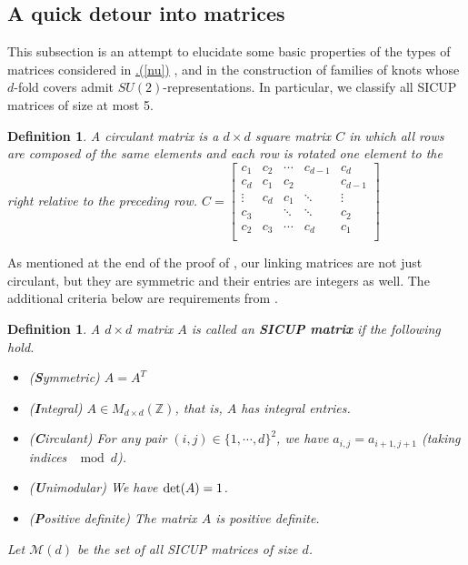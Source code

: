 \documentclass[11pt]{amsart}
\newtheorem{definition}[theorem]{Definition}
\newcommand{\Crefparts}[2]{%
  \hyperref[#2]{\Cref*{#1}.(\ref*{#2})}%
}
\newcommand{\Z}{\mathbb{Z}}
\newcommand{\bdefn}{\begin{definition}}
\newcommand{\edefn}{\end{definition}}
\begin{document}
\subsection{A quick detour into matrices} This subsection is an attempt to elucidate some basic properties of the types of matrices considered in \Crefparts{mainthm}{nu}, and in the construction of families of knots whose $d$-fold covers admit $SU(2)$-representations. In particular, we classify all SICUP matrices of size at most 5.

\begin{definition}\label{def:circulant} A circulant matrix is a $d\times d$ square matrix $C$ in which all rows are composed of the same elements and each row is rotated one element to the right relative to the preceding row. 
$\displaystyle 
C=\begin{bmatrix}
c_{1}&c_{2}&\cdots &c_{d-1}&c_{d}\\
c_{d}&c_{1}&c_{2}&&c_{d-1}\\
\vdots &c_{d}&c_{1}&\ddots &\vdots \\
c_{3}&&\ddots &\ddots &c_{2}\\
c_{2}&c_{3}&\cdots &c_{d}&c_{1}\\
\end{bmatrix}$

\end{definition}

As mentioned at the end of the proof of , our linking matrices are not just circulant, but they are symmetric and their entries are integers as well. The additional criteria below are requirements from .

\bdefn\label{defn: sicup matrices}
A $d\times d$ matrix $A$ is called an {\bf SICUP matrix} if the following hold.
\begin{itemize}
	\item ({\bf S}ymmetric) $A=A^T$
	\item ({\bf I}ntegral) $A\in M_{d\times d}(\Z)$, that is, $A$ has integral entries.
	\item ({\bf C}irculant) For any pair $(i,j)\in\{1,\cdots,d\}^2$, we have $a_{i,j} = a_{i+1,j+1}$ (taking indices $\mod d$).
	\item ({\bf U}nimodular) We have ${\rm det}(A) = 1$.
	\item ({\bf P}ositive definite) The matrix $A$ is positive definite.
\end{itemize}
Let $\mathcal{M}(d)$ be the set of all SICUP matrices of size $d$.
\edefn
\end{document}
